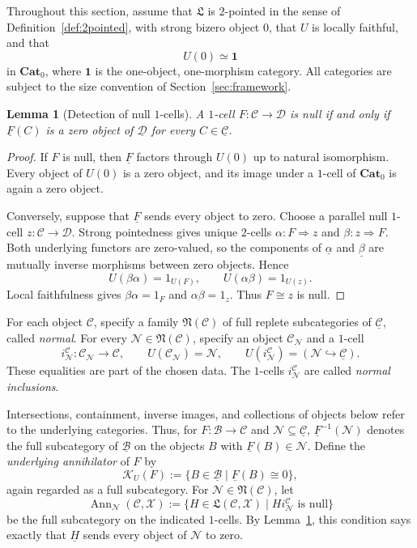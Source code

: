 \documentclass[11pt,reqno,a4paper]{amsart}
\newtheorem{lemma}[theorem]{Lemma}
\theoremstyle{definition}
\theoremstyle{remark}
\newcommand{\C}{\mathcal{C}}
\newcommand{\D}{\mathcal{D}}
\newcommand{\N}{\mathcal{N}}
\newcommand{\0}{\mathbf{0}}
\renewcommand{\1}{\mathbf{1}}
\newcommand{\iso}{\cong}
\newcommand{\Pt}{\mathbf{Cat}_{0}}
\newcommand{\Lcat}{\mathfrak L}
\newcommand{\B}{\mathcal B}
\newcommand{\X}{\mathcal X}
\DeclareMathOperator{\Ann}{Ann}
\begin{document}
Throughout this section, assume that $\Lcat$ is $2$-pointed in the
sense of Definition~\ref{def:2pointed}, with strong bizero object $0$,
that $U$ is locally faithful, and that
\[
 U(0)\simeq\mathbf{1}
\]
in $\Pt$, where $\mathbf{1}$ is the one-object, one-morphism category.
All categories are subject to the size convention of
Section~\ref{sec:framework}.

\begin{lemma}[Detection of null $1$-cells]\label{lem:criterion-null}
A $1$-cell $F:\C\to\D$ is null if and only if
$\underline{F}(C)$ is a zero object of $\underline{\D}$ for every
$C\in\underline{\C}$.
\end{lemma}
\begin{proof}
If $F$ is null, then $\underline{F}$ factors through $U(0)$ up to
natural isomorphism. Every object of $U(0)$ is a zero object, and
its image under a $1$-cell of $\Pt$ is again a zero object.

Conversely, suppose that $\underline{F}$ sends every object to zero.
Choose a parallel null $1$-cell $z:\C\to\D$. Strong pointedness
gives unique $2$-cells $\alpha:F\Rightarrow z$ and
$\beta:z\Rightarrow F$. Both underlying functors are zero-valued,
so the components of $\underline{\alpha}$ and
$\underline{\beta}$ are mutually inverse morphisms between zero
objects. Hence
\[
 U(\beta\alpha)=1_{U(F)},\qquad
 U(\alpha\beta)=1_{U(z)}.
\]
Local faithfulness gives $\beta\alpha=1_F$ and
$\alpha\beta=1_z$. Thus $F\iso z$ is null.
\end{proof}

For each object $\C$, specify a family $\mathfrak{N}(\C)$ of full
replete subcategories of $\underline{\C}$, called \emph{normal}.
For every $\N\in\mathfrak{N}(\C)$, specify an object $\C_{\N}$
and a $1$-cell
\[
 i_{\N}^{\C}:\C_{\N}\longrightarrow\C,
 \qquad
 U(\C_{\N})=\N,
 \qquad
 U(i_{\N}^{\C})=(\N\hookrightarrow\underline{\C}).
\]
These equalities are part of the chosen data. The $1$-cells
$i_{\N}^{\C}$ are called \emph{normal inclusions}.

Intersections, containment, inverse images, and collections of
objects below refer to the underlying categories. Thus, for
$F:\B\to\C$ and $\N\subseteq\underline{\C}$,
$\underline{F}^{-1}(\N)$ denotes the full subcategory of
$\underline{\B}$ on the objects $B$ with $\underline{F}(B)\in\N$.
Define the \emph{underlying annihilator} of $F$ by
\[
 \mathcal{K}_U(F)
 :=\{B\in\underline{\B}\mid\underline{F}(B)\iso0\},
\]
again regarded as a full subcategory. For
$\N\in\mathfrak{N}(\C)$, let
\[
 \Ann_{\N}(\C,\X)
 :=\{H\in\Lcat(\C,\X)\mid H i_{\N}^{\C}
       \text{ is null}\}
\]
be the full subcategory on the indicated $1$-cells.
By Lemma~\ref{lem:criterion-null}, this condition says exactly
that $\underline{H}$ sends every object of $\N$ to zero.
\end{document}

